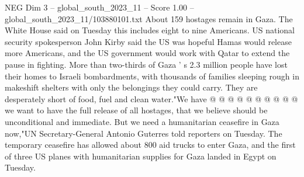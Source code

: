 \begin{textsample}{NEG Dim 3 – global\_south\_2023\_11 – Score 1.00 – global\_south\_2023\_11/103880101.txt}
About 159 hostages remain in Gaza.
The White House said on Tuesday this includes eight to nine Americans.
US national security spokesperson John Kirby said the US was hopeful Hamas would release more Americans, and the US government would work with Qatar to extend the pause in fighting.
More than two-thirds of Gaza ' s 2.3 million people have lost their homes to Israeli bombardments, with thousands of families sleeping rough in makeshift shelters with only the belongings they could carry.
They are desperately short of food, fuel and clean water."We have @ @ @ @ @ @ @ @ @ @ we want to have the full release of all hostages, that we believe should be unconditional and immediate.
But we need a humanitarian ceasefire in Gaza now,"UN Secretary-General Antonio Guterres told reporters on Tuesday.
The temporary ceasefire has allowed about 800 aid trucks to enter Gaza, and the first of three US planes with humanitarian supplies for Gaza landed in Egypt on Tuesday.

\end{textsample}
